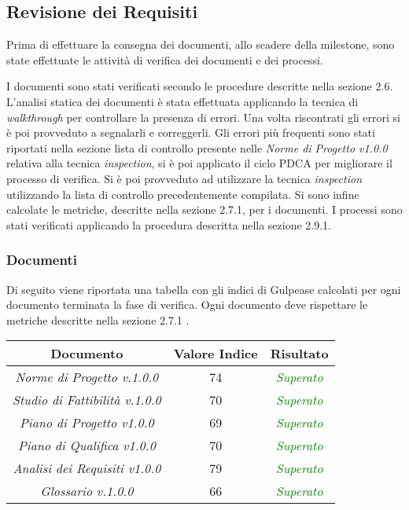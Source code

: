\subsection{Revisione dei Requisiti}

Prima di effettuare la consegna dei documenti, allo scadere della \gls{milestone}, sono state effettuate le attività di verifica dei documenti e dei processi.

\noindent I documenti sono stati verificati secondo le procedure descritte nella sezione 2.6.
L'analisi statica dei documenti è stata effettuata applicando la tecnica di \textit{\gls{walkthrough}} per controllare la presenza di errori. Una volta riscontrati gli errori si è poi provveduto a segnalarli e correggerli. Gli errori più frequenti sono stati riportati nella sezione lista di controllo presente nelle \textit{Norme di Progetto v1.0.0} relativa alla tecnica \textit{\gls{inspection}}, si è poi applicato il ciclo \gls{PDCA} per migliorare il processo di verifica. Si è poi provveduto ad utilizzare la tecnica \textit{\gls{inspection}} utilizzando la lista di controllo precedentemente compilata. Si sono infine calcolate le metriche, descritte nella sezione 2.7.1, per i documenti. I processi sono stati verificati applicando la procedura descritta nella sezione 2.9.1.

\subsubsection{Documenti}

Di seguito viene riportata una tabella con gli indici di \gls{Gulpease} calcolati per ogni documento terminata la fase di verifica. Ogni documento deve rispettare le metriche descritte nella sezione 2.7.1 .\\

\hspace{1cm}

\begin{center}
\begin{tabular}{|c|c|c|}
\hline 
\textbf{Documento} & \textbf{Valore Indice} & \textbf{Risultato} \\ 
\hline
\textit{Norme di Progetto v.1.0.0} & 74 & \textcolor{green}{\textit{Superato}} \\ 
\textit{Studio di Fattibilità v.1.0.0} & 70 & \textcolor{green}{\textit{Superato}} \\ 
\textit{Piano di Progetto v1.0.0} & 69 & \textcolor{green}{\textit{Superato}} \\ 
\textit{Piano di Qualifica v1.0.0} & 70 & \textcolor{green}{\textit{Superato}} \\ 
\textit{Analisi dei Requisiti v1.0.0} & 79 & \textcolor{green}{\textit{Superato}} \\ 
\textit{Glossario v.1.0.0} & 66 & \textcolor{green}{\textit{Superato}} \\ 
\hline 
\end{tabular}

\end{center}

